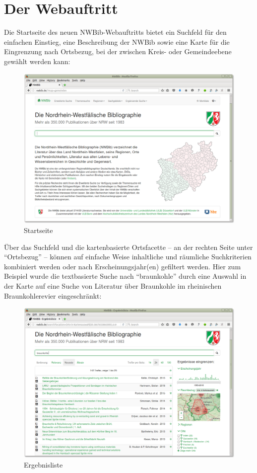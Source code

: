 \documentclass[a4paper,
fontsize=11pt,
oneside,
numbers=noperiodatend,
parskip=half-,
bibliography=totoc,
final
]{scrartcl}
\begin{document}
\section*{Der Webauftritt}\label{der-webauftritt}

Die Startseite des neuen NWBib-Webauftritts bietet ein Suchfeld für den
einfachen Einstieg, eine Beschreibung der NWBib sowie eine Karte für die
Eingrenzung nach Ortsbezug, bei der zwischen Kreis- oder Gemeindeebene
gewählt werden kann:

\begin{figure}[htbp]
\centering
\includegraphics{img/nwbib-screenshot-startseite.png}
\caption{Startseite}
\end{figure}

Über das Suchfeld und die kartenbasierte Ortsfacette -- an der rechten
Seite unter \enquote{Ortsbezug} -- können auf einfache Weise inhaltliche
und räumliche Suchkriterien kombiniert werden oder nach
Erscheinungsjahr(en) gefiltert werden. Hier zum Beispiel wurde die
textbasierte Suche nach \enquote{braunkohle} durch eine Auswahl in der
Karte auf eine Suche von Literatur über Braunkohle im rheinischen
Braunkohlerevier eingeschränkt:

\begin{figure}[htbp]
\centering
\includegraphics{img/nwbib-screenshot-ergebnisliste.png}
\caption{Ergebnisliste}
\end{figure}
\end{document}
